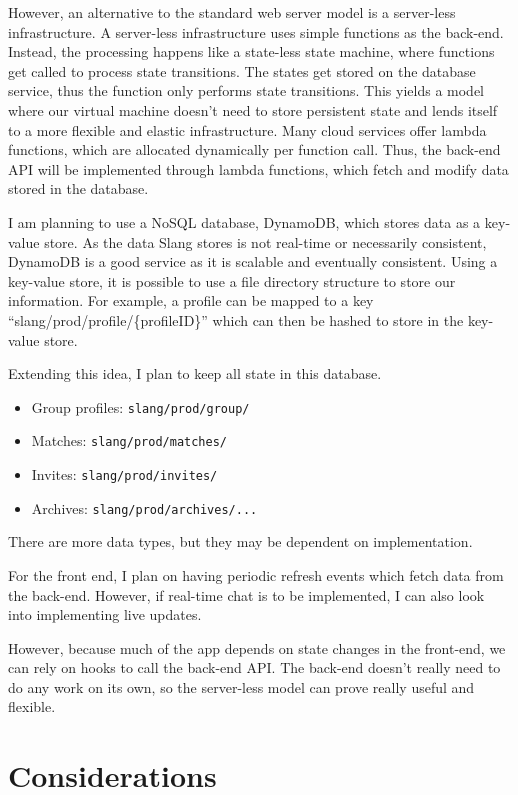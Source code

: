 \documentclass[12pt]{article}
\begin{document}
However, an alternative to the standard web server model is a server-less infrastructure. A server-less infrastructure uses simple functions as the back-end. Instead, the processing happens like a state-less state machine, where functions get called to process state transitions. The states get stored on the database service, thus the function only performs state transitions. This yields a model where our virtual machine doesn't need to store persistent state and lends itself to a more flexible and elastic infrastructure. Many cloud services offer lambda functions, which are allocated dynamically per function call. Thus, the back-end API will be implemented through lambda functions, which fetch and modify data stored in the database.

I am planning to use a NoSQL database, DynamoDB, which stores data as a key-value store. As the data Slang stores is not real-time or necessarily consistent, DynamoDB is a good service as it is scalable and eventually consistent. Using a key-value store, it is possible to use a file directory structure to store our information. For example, a profile can be mapped to a key ``slang/prod/profile/\{profileID\}'' which can then be hashed to store in the key-value store.

Extending this idea, I plan to keep all state in this database. 
\begin{itemize}
    \item Group profiles: \texttt{slang/prod/group/}
    \item Matches: \texttt{slang/prod/matches/}
    \item Invites: \texttt{slang/prod/invites/}
    \item Archives: \texttt{slang/prod/archives/...}

\end{itemize}

There are more data types, but they may be dependent on implementation.

For the front end, I plan on having periodic refresh events which fetch data from the back-end. However, if real-time chat is to be implemented, I can also look into implementing live updates. 

However, because much of the app depends on state changes in the front-end, we can rely on hooks to call the back-end API. The back-end doesn't really need to do any work on its own, so the server-less model can prove really useful and flexible.

\section*{Considerations}
\end{document}
